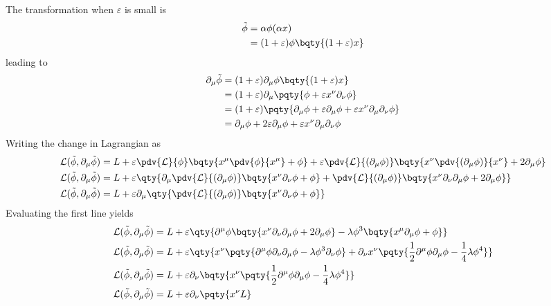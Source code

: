 \documentclass[12pt]{article}
\begin{document}
        The transformation when \(\varepsilon\) is small is \begin{align*}
            \tilde{\phi} &=  \alpha \phi(\alpha x) \\
            &=  (1 + \varepsilon)\phi\bqty{(1 + \varepsilon)x}
        \end{align*}
        leading to \begin{align*}
            \partial_\mu\tilde{\phi} &= (1 + \varepsilon)\partial_\mu \phi\bqty{(1 + \varepsilon)x}\\
            &= (1 + \varepsilon)\partial_\mu\pqty{\phi + \varepsilon  x^\nu\partial_\nu \phi}\\
            &= (1 + \varepsilon)\pqty{\partial_\mu\phi + \varepsilon \partial_\mu \phi+ \varepsilon x^\nu\partial_\mu\partial_\nu \phi }\\
            &= {\partial_\mu\phi + 2\varepsilon \partial_\mu \phi+ \varepsilon x^\nu\partial_\mu\partial_\nu \phi }
        \end{align*}
        Writing the change in Lagrangian as 
        \begin{align*}
            \mathcal{L}(\tilde{\phi},\partial_\mu \tilde{\phi}) &=  L + \varepsilon \pdv{\mathcal{L}}{\phi}\bqty{x^\mu\pdv{\phi}{x^\mu} + \phi} + \varepsilon \pdv{\mathcal{L}}{(\partial_\mu \phi)}\bqty{x^\nu\pdv{(\partial_\mu \phi)}{x^\nu} + 2\partial_\mu \phi} \\
            \mathcal{L}(\tilde{\phi},\partial_\mu \tilde{\phi}) &=  L + \varepsilon\qty{ \partial_\mu\pdv{\mathcal{L}}{(\partial_\mu \phi)}\bqty{x^\nu \partial_\nu {\phi} + \phi} + \pdv{\mathcal{L}}{(\partial_\mu \phi)}\bqty{x^\nu\partial_\nu{\partial_\mu \phi} + 2\partial_\mu \phi}} \\
            \mathcal{L}(\tilde{\phi},\partial_\mu \tilde{\phi}) &=  L + \varepsilon \partial_\mu\qty{ \pdv{\mathcal{L}}{(\partial_\mu \phi)}\bqty{x^\nu \partial_\nu {\phi} + \phi} }
        \end{align*}
        Evaluating the first line yields \begin{align*}
            \mathcal{L}(\tilde{\phi},\partial_\mu \tilde{\phi}) &=  L + \varepsilon\qty{ \partial^\mu \phi\bqty{x^\nu \partial_\nu\partial_\mu \phi+ 2\partial_\mu \phi} - \lambda \phi^3\bqty{x^\mu \partial_\mu{\phi} + \phi} } \\
            \mathcal{L}(\tilde{\phi},\partial_\mu \tilde{\phi}) &=  L + \varepsilon\qty{ x^\nu\pqty{\partial^\mu \phi \partial_\nu \partial_\mu \phi - \lambda \phi^3 \partial_\nu \phi} + \partial_\nu x^\nu \pqty{\frac{1}{2}\partial^\mu \phi \partial_\mu\phi - \frac{1}{4}\lambda \phi^4} } \\
            \mathcal{L}(\tilde{\phi},\partial_\mu \tilde{\phi}) &=  L +  \varepsilon \partial_\nu\bqty{ x^\nu\pqty{\frac{1}{2}\partial^\mu \phi  \partial_\mu \phi - \frac{1}{4}\lambda \phi^4}} \\
            \mathcal{L}(\tilde{\phi},\partial_\mu \tilde{\phi}) &=  L +  \varepsilon \partial_\nu\pqty{ x^\nu L }
        \end{align*}
\end{document}
